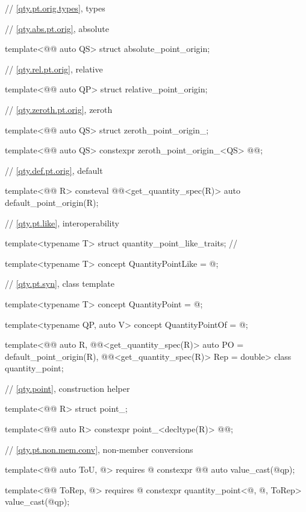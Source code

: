 \begin{codeblock}
{// \ref{qty.pt.orig.types}, types

// \ref{qty.abs.pt.orig}, absolute

template<@@ auto QS>
struct absolute_point_origin;

// \ref{qty.rel.pt.orig}, relative

template<@@ auto QP>
struct relative_point_origin;

// \ref{qty.zeroth.pt.orig}, zeroth

template<@@ auto QS>
struct zeroth_point_origin_;

template<@@ auto QS>
constexpr zeroth_point_origin_<QS> @@{};

// \ref{qty.def.pt.orig}, default

template<@@ R>
consteval @@<get_quantity_spec(R{})> auto default_point_origin(R);

// \ref{qty.pt.like}, interoperability

template<typename T>
struct quantity_point_like_traits;  // \notdef

template<typename T>
concept QuantityPointLike = @\seebelownc@;

// \ref{qty.pt.syn}, class template 

template<typename T>
concept QuantityPoint = @\seebelownc@;

template<typename QP, auto V>
concept QuantityPointOf = @\seebelownc@;

template<@@ auto R,
         @@<get_quantity_spec(R)> auto PO = default_point_origin(R),
         @@<get_quantity_spec(R)> Rep = double>
class quantity_point;

// \ref{qty.point}, construction helper 

template<@@ R>
struct point_;

template<@@ auto R>
constexpr point_<decltype(R)> @@{};

// \ref{qty.pt.non.mem.conv}, non-member conversions

template<@@ auto ToU, @\seebelownc@>
  requires @\seebelownc@
constexpr @@ auto value_cast(@\seebelownc@ qp);

template<@@ ToRep, @\seebelownc@>
  requires @\seebelownc@
constexpr quantity_point<@\seebelownc@, @\seebelownc@, ToRep> value_cast(@\seebelownc@ qp);

}
\end{codeblock}
